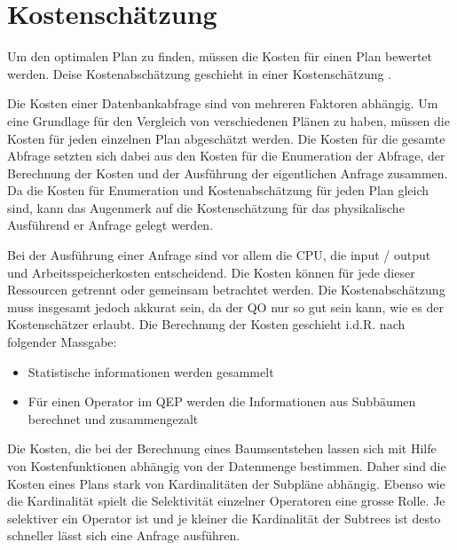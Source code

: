 \section{Kostenschätzung}
Um den optimalen Plan zu finden, müssen die Kosten für einen Plan bewertet werden. Deise Kostenabschätzung geschieht in einer Kostenschätzung \cite{bruno2011automated}. 

Die Kosten einer Datenbankabfrage sind von mehreren Faktoren abhängig. Um eine Grundlage für den Vergleich von verschiedenen Plänen zu haben, müssen die Kosten für jeden einzelnen Plan abgeschätzt werden. Die Kosten für die gesamte Abfrage setzten sich dabei aus den Kosten für die Enumeration der Abfrage, der Berechnung der Kosten und der Ausführung der eigentlichen Anfrage zusammen. Da die Kosten für Enumeration und Kostenabschätzung für jeden Plan gleich sind, kann das Augenmerk auf die Kostenschätzung für das physikalische Ausführend er Anfrage gelegt werden.

Bei der Ausführung einer Anfrage sind vor allem die CPU, die input / output und Arbeitsspeicherkosten entscheidend. Die Kosten können für jede dieser Ressourcen getrennt oder gemeinsam betrachtet werden. Die Kostenabschätzung muss insgesamt jedoch akkurat sein, da der \ac{QO} nur so gut sein kann, wie es der Kostenschätzer erlaubt. Die Berechnung der Kosten geschieht i.d.R. nach folgender Massgabe:

\begin{itemize}
\item Statistische informationen werden gesammelt
\item Für einen Operator im \ac{QEP} werden die Informationen aus Subbäumen berechnet und zusammengezalt
\end{itemize}

Die Kosten, die bei der Berechnung eines Baumsentstehen lassen sich mit Hilfe von Kostenfunktionen abhängig von der Datenmenge bestimmen. Daher sind die Kosten eines Plans stark von Kardinalitäten der Subpläne abhängig. Ebenso wie die Kardinalität spielt die Selektivität einzelner Operatoren eine grosse Rolle. Je selektiver ein Operator ist und je kleiner die Kardinalität der Subtrees ist desto schneller lässt sich eine Anfrage ausführen.

 
